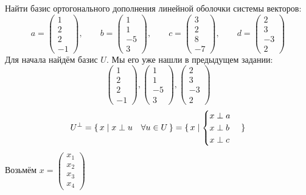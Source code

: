 Найти базис ортогонального дополнения линейной оболочки системы векторов:
$$
a = \begin{pmatrix}
	1 \\
    2 \\
    2 \\
    -1
\end{pmatrix}, \qquad b =
\begin{pmatrix}
	1 \\
    1 \\
    -5 \\
    3
\end{pmatrix}, \qquad c =
\begin{pmatrix}
	3 \\
    2 \\
    8 \\
    -7
\end{pmatrix}, \qquad d =
\begin{pmatrix}
	2 \\
    3 \\
    -3 \\
    2
\end{pmatrix} $$
Для начала найдём базис $ U $. Мы его уже нашли в предыдущем задании:
$$
\begin{pmatrix}
	1 \\
    2 \\
    2 \\
    -1
\end{pmatrix},
\begin{pmatrix}
	1 \\
    1 \\
    -5 \\
    3
\end{pmatrix},
\begin{pmatrix}
	2 \\
    3 \\
    -3 \\
    2
\end{pmatrix} $$
$$ U^\perp = \set{x | x \perp u \quad \forall u \in U} = \set{x |
    \begin{cases}
    	x \perp a \\
        x \perp b \\
        x \perp c
    \end{cases}} $$
Возьмём $ x =
\begin{pmatrix}
	x_1 \\
    x_2 \\
    x_3 \\
    x_4
\end{pmatrix} $
